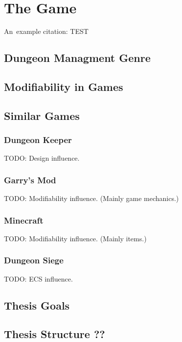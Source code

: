 \chapter{The Game}

An~example citation: \cite{Andel07}
TEST

\section{Dungeon Managment Genre}

\section{Modifiability in Games}

\section{Similar Games}

\subsection{Dungeon Keeper}
TODO: Design influence.

\subsection{Garry's Mod}
TODO: Modifiability influence. (Mainly game mechanics.)

\subsection{Minecraft}
TODO: Modifiability influence. (Mainly items.)

\subsection{Dungeon Siege}
TODO: ECS influence.

\section{Thesis Goals}

\section{Thesis Structure ??}
